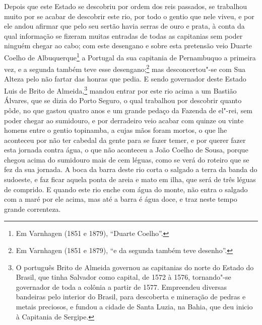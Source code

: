 Depois que este Estado se descobriu por ordem dos reis passados, se trabalhou muito por se
acabar de descobrir este rio, por todo o gentio que nele viveu, e por ele andou afirmar
que pelo seu sertão havia serras de ouro e prata, à conta da qual informação se fizeram
muitas entradas de todas as capitanias sem poder ninguém chegar ao cabo; com este
desengano e sobre esta pretensão veio Duarte Coelho de Albuquerque\footnote{ Em Varnhagen
(1851 e 1879), ``Duarte Coelho''.} a Portugal da sua capitania de Pernambuquo a primeira
vez, e a segunda também teve esse desengano;\footnote{ Em Varnhagen (1851 e 1879), ``e da
segunda também teve desenho''.} mas desconcertou"-se com Sua Alteza pelo não fartar das
honras que pedia. E sendo governador deste Estado Luis de Brito de Almeida,\footnote{ O
português Brito de Almeida governou as capitanias do norte do Estado do Brasil, que tinha
Salvador como capital, de 1572 à 1576, tornando"-se governador de toda a colônia a partir
de 1577. Empreendeu diversas bandeiras pelo interior do Brasil, para descoberta e
mineração de pedras e metais preciosos, e fundou a cidade de Santa Luzia, na Bahia, que deu
inicio à Capitania de Sergipe.} mandou entrar por este rio acima a um Bastião Álvares,
que se dizia do Porto Seguro, o qual trabalhou por descobrir quanto pôde, no que gastou
quatro anos e um grande pedaço da Fazenda de el"-rei, sem poder chegar ao sumidouro, e por
derradeiro veio acabar com quinze ou vinte homens entre o gentio topinamba, a cujas mãos
foram mortos, o que lhe aconteceu por não ter cabedal da gente para se fazer temer, e por
querer fazer esta jornada contra água, o que não aconteceu a João Coelho de Sousa, porque
chegou acima do sumidouro mais de cem léguas, como se verá do roteiro que se fez da sua
jornada. A boca da barra deste rio corta o salgado a terra da banda do sudoeste, e faz
ficar aquela ponta de areia e mato em ilha, que será de três léguas de comprido. E quando
este rio enche com água do monte, não entra o salgado com a maré por ele acima, mas até a
barra é água doce, e traz neste tempo grande correnteza.

